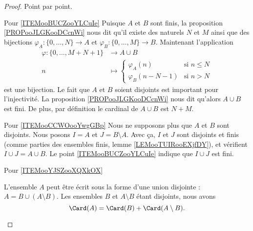 \begin{proof}
    Point par point.
    \begin{subproof}
    \item[Pour \ref{ITEMooBUCZooYLCuIe}]
        Puisque \( A\) et \( B\) sont finis, la proposition \ref{PROPooJLGKooDCcnWi} nous dit qu'il existe des naturels \( N\) et \( M\) ainsi que des bijections \( \varphi_A\colon \{ 0,\ldots, N \}\to A\) et \( \varphi_B\colon \{ 0,\ldots, M \}\to B\). Maintenant l'application
        \begin{equation}
            \begin{aligned}
                \varphi\colon \{ 0,\ldots, M+N+1 \}&\to A\cup B \\
                n&\mapsto \begin{cases}
                    \varphi_A(n)    &   \text{si }  n\leq N\\
                    \varphi_B(n-N-1)    &    \text{si } n>N
                \end{cases}
            \end{aligned}
        \end{equation}
        est une bijection. Le fait que \( A\) et \( B\) soient disjoints est important pour l'injectivité.  La proposition \ref{PROPooJLGKooDCcnWi} nous dit qu'alors \( A\cup B\) est fini. De plus, par définition le cardinal de \( A\cup B\) est \( N+M\).

    \item[Pour \ref{ITEMooCCWOooYwgGBp}]
        Nous ne supposons plus que \( A\) et \( B\) sont disjoints. Nous posons \( I=A\) et \( J=B\setminus A\). Avec ça, \( I\) et \( J\) sont disjoints et finis (comme parties des ensembles finis, lemme \ref{LEMooTUIRooEXjfDY}), et vérifient \( I\cup J=A\cup B\). Le point \ref{ITEMooBUCZooYLCuIe} indique que \( I\cup J\) est fini.

    \item[Pour \ref{ITEMooYJSZooXQXkOX}]

        L'ensemble \( A\) peut être écrit sous la forme d'une union disjointe : \( A=B\cup(A\setminus B)\). Les ensembles \( B\) et \( A\setminus B\) étant disjoints, nous avons
        \begin{equation}
            \Card(A)=\Card(B)+\Card(A\setminus B).
        \end{equation}


\end{subproof}
\end{proof}

